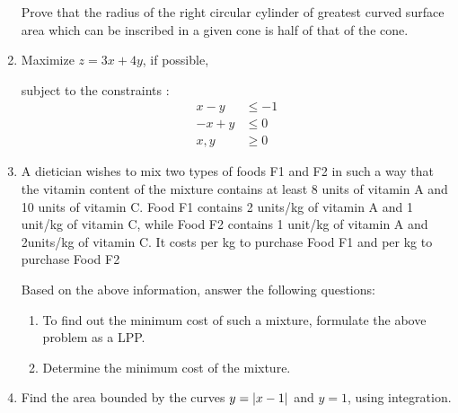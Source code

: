 \begin{enumerate}
Prove that the radius of the right circular cylinder of greatest curved surface area which can be inscribed in a given cone is half of that of the cone.

\item Maximize $z=3x + 4y$, if possible,

subject to the constraints :
\begin{align}
 x - y &\le - 1 \\
-x + y &\le 0 \\
x, y &\ge 0
\end{align}


\item A dietician wishes to mix two types of foods F1 and F2 in such a way that the vitamin content of the mixture contains at least 8 units of vitamin A and 10 units of vitamin C. Food F1 contains 2 units/kg of vitamin A  and 1 unit/kg of vitamin C, while Food F2 contains 1 unit/kg of vitamin A and 2units/kg of vitamin C. It costs   per kg to purchase Food F1 and    per kg to purchase Food F2


Based on the above information, answer the following questions:


\begin{enumerate}
\item To find out the minimum cost of such a mixture, formulate the above problem as a LPP.
\item Determine the minimum cost of the mixture.
\end{enumerate}


\item Find the area bounded by the curves $y = \left\vert x - 1\right\vert$ and $y = 1$, using integration.

\end{enumerate}
